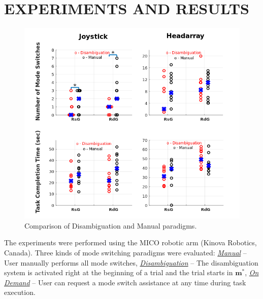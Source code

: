 \documentclass[conference]{IEEEtran}
\begin{document}
\section{EXPERIMENTS AND RESULTS} \label{EV}
\begin{figure}[t]
	\centering
	\includegraphics[width = 0.7\hsize,center]{./figures/DATA_PLOT.png}
	\vspace{-0.7cm}
	\caption{Comparison of Disambiguation and Manual paradigms.}
	\label{DATAPLOT}
	\vspace{-0.5cm}
\end{figure}
The experiments were performed using the MICO robotic arm (Kinova Robotics, Canada).
Three kinds of mode switching paradigms were evaluated:
\noindent\underline{\textit{Manual}} -- User manually performs all mode switches, \noindent\underline{\textit{Disambiguation}} -- The disambiguation system is activated right at the beginning of a trial and the trial starts in $\boldsymbol{m}^*$,  \noindent\underline{\textit{On Demand}} -- User can request a mode switch assistance at any time during task execution.
\end{document}
